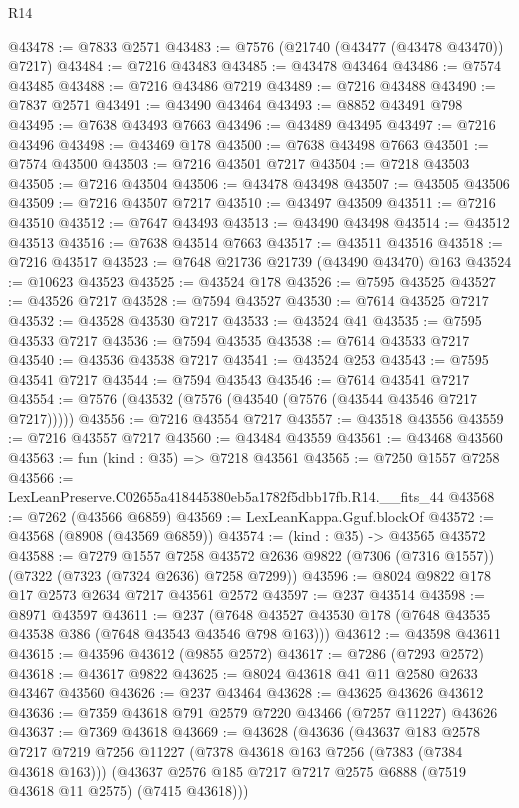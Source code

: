 \begin{lexlean}{R14}
\begin{coremodule}
@43478 := @7833 @2571
@43483 := @7576 (@21740 (@43477 (@43478 @43470)) @7217)
@43484 := @7216 @43483
@43485 := @43478 @43464
@43486 := @7574 @43485
@43488 := @7216 @43486 @7219
@43489 := @7216 @43488
@43490 := @7837 @2571
@43491 := @43490 @43464
@43493 := @8852 @43491 @798
@43495 := @7638 @43493 @7663
@43496 := @43489 @43495
@43497 := @7216 @43496
@43498 := @43469 @178
@43500 := @7638 @43498 @7663
@43501 := @7574 @43500
@43503 := @7216 @43501 @7217
@43504 := @7218 @43503
@43505 := @7216 @43504
@43506 := @43478 @43498
@43507 := @43505 @43506
@43509 := @7216 @43507 @7217
@43510 := @43497 @43509
@43511 := @7216 @43510
@43512 := @7647 @43493
@43513 := @43490 @43498
@43514 := @43512 @43513
@43516 := @7638 @43514 @7663
@43517 := @43511 @43516
@43518 := @7216 @43517
@43523 := @7648 @21736 @21739 (@43490 @43470) @163
@43524 := @10623 @43523
@43525 := @43524 @178
@43526 := @7595 @43525
@43527 := @43526 @7217
@43528 := @7594 @43527
@43530 := @7614 @43525 @7217
@43532 := @43528 @43530 @7217
@43533 := @43524 @41
@43535 := @7595 @43533 @7217
@43536 := @7594 @43535
@43538 := @7614 @43533 @7217
@43540 := @43536 @43538 @7217
@43541 := @43524 @253
@43543 := @7595 @43541 @7217
@43544 := @7594 @43543
@43546 := @7614 @43541 @7217
@43554 := @7576 (@43532 (@7576 (@43540 (@7576 (@43544 @43546 @7217 @7217)))))
@43556 := @7216 @43554 @7217
@43557 := @43518 @43556
@43559 := @7216 @43557 @7217
@43560 := @43484 @43559
@43561 := @43468 @43560
@43563 := fun (kind : @35) => @7218 @43561
@43565 := @7250 @1557 @7258
@43566 := LexLeanPreserve.C02655a418445380eb5a1782f5dbb17fb.R14.__fits_44
@43568 := @7262 (@43566 @6859)
@43569 := LexLeanKappa.Gguf.blockOf
@43572 := @43568 (@8908 (@43569 @6859))
@43574 := (kind : @35) -> @43565 @43572
@43588 := @7279
    @1557
    @7258
    @43572
    @2636
    @9822
    (@7306 (@7316 @1557))
    (@7322 (@7323 (@7324 @2636) @7258 @7299))
@43596 := @8024 @9822 @178 @17 @2573 @2634 @7217 @43561 @2572
@43597 := @237 @43514
@43598 := @8971 @43597
@43611 := @237 (@7648 @43527 @43530 @178 (@7648 @43535 @43538 @386 (@7648 @43543 @43546 @798 @163)))
@43612 := @43598 @43611
@43615 := @43596 @43612 (@9855 @2572)
@43617 := @7286 (@7293 @2572)
@43618 := @43617 @9822
@43625 := @8024 @43618 @41 @11 @2580 @2633 @43467 @43560
@43626 := @237 @43464
@43628 := @43625 @43626 @43612
@43636 := @7359 @43618 @791 @2579 @7220 @43466 (@7257 @11227) @43626
@43637 := @7369 @43618
@43669 := @43628
    (@43636
      (@43637
        @183
        @2578
        @7217
        @7219
        @7256
        @11227
        (@7378 @43618 @163 @7256 (@7383 (@7384 @43618 @163)))
        (@43637 @2576 @185 @7217 @7217 @2575 @6888 (@7519 @43618 @11 @2575) (@7415 @43618)))

\end{coremodule}
\end{lexlean}
